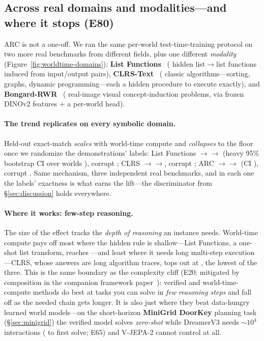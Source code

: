 \documentclass[11pt]{article}
\begin{document}
\subsection{Across real domains and modalities---and where it stops (E80)}\label{sec:world-time-domains}
ARC is not a one-off. We ran the same per-world test-time-training protocol on two
more real benchmarks from different fields, plus one different \emph{modality}
(Figure~\ref{fig:worldtime-domains}): \textbf{List Functions}~\cite{srivastava2022bigbench}
(\LfNumWorlds{} hidden list$\to$list functions induced from input/output pairs),
\textbf{CLRS-Text}~\cite{markeeva2024clrstext,velickovic2022clrs} (\ClrsNumWorlds{} classic
algorithms---sorting, graphs, dynamic programming---each a hidden procedure to execute exactly),
and \textbf{Bongard-RWR}~\cite{bongardrwr2024,bongardrwrplus2025} (\BongNumWorlds{} real-image visual
concept-induction problems, via frozen DINOv2 features + a per-world head).

\paragraph{The trend replicates on every symbolic domain.} Held-out exact-match \emph{scales}
with world-time compute and \emph{collapses} to the floor once we randomize the demonstrations'
labels: List Functions \LfZero$\to$\LfLight$\to$\LfHeavy{} (heavy 95\% bootstrap CI over
worlds \LfHeavyCI), corrupt \LfCorrupt; CLRS \ClrsZero$\to$\ClrsLight$\to$\ClrsHeavy, corrupt
\ClrsCorrupt; ARC \ArcZeroShot$\to$\ArcTTTLight$\to$\ArcTTTHeavy{} (CI \ArcHeavyCI), corrupt
\ArcTTTCorrupt. Same mechanism, three independent real benchmarks, and in each one the labels'
exactness is what earns the lift---the discriminator from \S\ref{sec:discussion} holds everywhere.

\paragraph{Where it works: few-step reasoning.} The size of the effect tracks the
\emph{depth of reasoning} an instance needs. World-time compute pays off most where the
hidden rule is shallow---List Functions, a one-shot list transform, reaches \LfHeavy---and least
where it needs long multi-step execution---CLRS, whose answers are long algorithm traces, tops
out at \ClrsHeavy, the lowest of the three. This is the same boundary as the complexity cliff
(E20; mitigated by composition in the companion framework paper~\cite{openworld_framework}): verified and world-time-compute methods do best at tasks you can solve
in \emph{few reasoning steps} and fall off as the needed chain gets longer. It is also just
where they beat data-hungry learned world models---on the short-horizon \textbf{MiniGrid DoorKey}
planning task (\S\ref{sec:minigrid}) the verified model solves \emph{zero-shot} while DreamerV3
needs ${\sim}10^4$ interactions (\MGDreamerFirstSolve{} to first solve; E65) and V-JEPA-2 cannot control at all.
\end{document}
